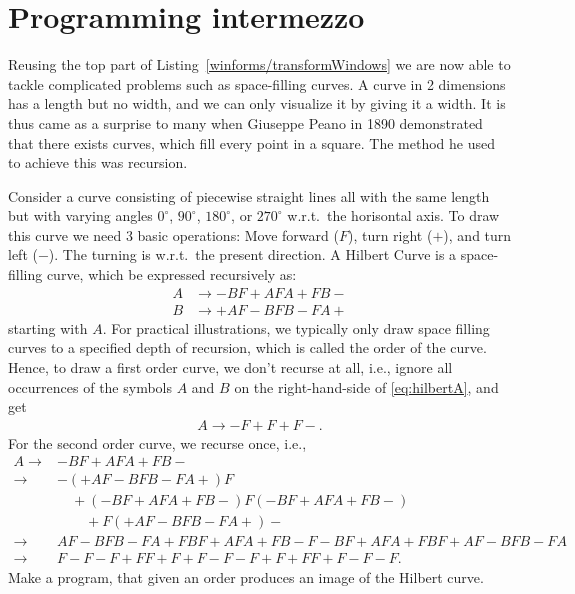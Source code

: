 \section{Programming intermezzo}
Reusing the top part of Listing~\ref{winforms/transformWindows} we are now able to tackle complicated problems such as space-filling curves. A curve in 2 dimensions has a length but no width, and we can only visualize it by giving it a width. It is thus came as a surprise to many when Giuseppe Peano in 1890 demonstrated that there exists curves, which fill every point in a square. The method he used to achieve this was recursion.
\begin{problem}
  Consider a curve consisting of piecewise straight lines all with the same length but with varying angles $0^{\circ}$, $90^{\circ}$, $180^{\circ}$, or $270^{\circ}$ w.r.t.\ the horisontal axis. To draw this curve we need 3 basic operations: Move forward ($F$), turn right ($+$), and turn left ($-$). The turning is w.r.t.\ the present direction. A Hilbert Curve is a space-filling curve, which be expressed recursively as:
\begin{align}
  A &\rightarrow -BF+AFA+FB-\label{eq:hilbertA}\\
  B &\rightarrow +AF-BFB-FA+\label{eq:hilbertB}
\end{align}
starting with $A$. For practical illustrations, we typically only draw space filling curves to a specified depth of recursion, which is called the order of the curve. Hence, to draw a first order curve, we don't recurse at all, i.e., ignore all occurrences of the symbols $A$ and $B$ on the right-hand-side of \eqref{eq:hilbertA}, and get 
\begin{align*}
  A \rightarrow -F+F+F-. 
\end{align*}
For the second order curve, we recurse once, i.e., 
\begin{align*}
  A 
  \rightarrow &-BF+AFA+FB- \\
  \rightarrow &-(+AF-BFB-FA+)F\\
               &\quad+(-BF+AFA+FB-)F(-BF+AFA+FB-)\\
               &\qquad +F(+AF-BFB-FA+)-\\
  \rightarrow &AF-BFB-FA+FBF+AFA+FB-F-BF+AFA+FBF+AF-BFB-FA\\
  \rightarrow &F-F-F+FF+F+F-F-F+F+FF+F-F-F.
\end{align*}
Make a program, that given an order produces an image of the Hilbert curve.
\end{problem}
